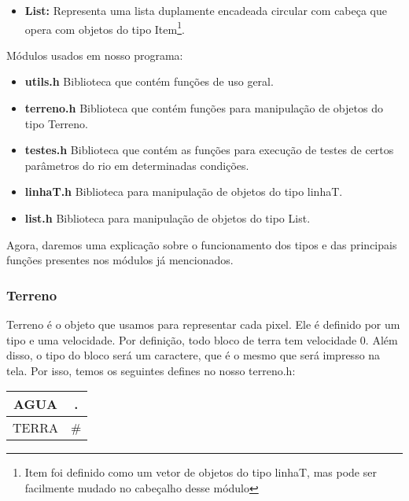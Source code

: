 \documentclass[11pt]{article}
\begin{document}
\begin{flushleft}
\begin{itemize}
\item \textbf{List:} Representa uma lista duplamente encadeada circular
com cabeça que opera com objetos do tipo Item\footnote{Item foi definido como um vetor de objetos do tipo linhaT, mas pode ser facilmente mudado no cabeçalho desse módulo}.

\end{itemize}

Módulos usados em nosso programa:

\begin{itemize}
	\item \textbf{utils.h} Biblioteca que contém funções de uso geral.
	
	\item \textbf{terreno.h} Biblioteca que contém funções para manipulação de 		objetos do tipo Terreno.
	
	\item \textbf{testes.h} Biblioteca que contém as funções para execução de testes de certos parâmetros do rio em determinadas condições.
	
	\item \textbf{linhaT.h} Biblioteca para manipulação de objetos do tipo linhaT.
	
	\item \textbf{list.h} Biblioteca para manipulação de objetos do tipo List.
	
\end{itemize}
\end{flushleft}

Agora, daremos uma explicação sobre o funcionamento dos tipos e das principais funções presentes nos módulos já mencionados.

\subsubsection{Terreno}

Terreno é o objeto que usamos para representar cada pixel. Ele é definido por um tipo e uma velocidade. Por definição, todo bloco de terra tem velocidade 0.
Além disso, o tipo do bloco será um caractere, que é o mesmo que será impresso na tela. Por isso, temos os seguintes defines no nosso terreno.h:
\begin{center}
\begin{tabular}{|c|c|}
\hline
AGUA & .\\
\hline
TERRA & \#\\
\hline
\end{tabular}
\end{center}
\end{document}

